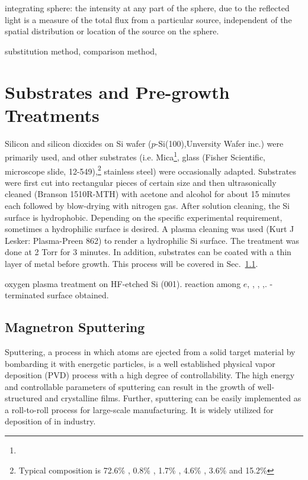 integrating sphere: the intensity at any part of the sphere, due to the reflected light is a measure of the total flux from a particular source, independent of the spatial distribution or location of the source on the sphere. 

substitution method, comparison method, 

\fi
\section{Substrates and Pre-growth Treatments}\label{ch2sub}

Silicon and silicon dioxides on Si wafer ($p$-Si(100),Unversity Wafer inc.) were primarily used, and other substrates (i.e. Mica\footnote{ }, glass (Fisher Scientific, microscope slide, 12-549),\footnote{Typical composition is 72.6\% , 0.8\% , 1.7\% , 4.6\% , 3.6\%  and 15.2\% } stainless steel) were occasionally adapted. Substrates were first cut into rectangular pieces of certain size and then ultrasonically cleaned (Branson 1510R-MTH) with acetone and alcohol for about 15 minutes each followed by blow-drying with nitrogen gas. After solution cleaning, the Si surface is hydrophobic. Depending on the specific experimental requirement, sometimes a hydrophilic surface is desired. A plasma cleaning was used (Kurt J Lesker: Plasma-Preen 862) to render a hydrophilic Si surface. The treatment was done at 2 Torr  for 3 minutes. In addition, substrates can be coated with a thin layer of metal before growth. This process will be covered  in Sec.~\ref{sec:mag}.

oxygen plasma treatment on HF-etched Si (001). reaction among $e$, , , ,. -terminated surface obtained.\cite{Habib2010}

\subsection{Magnetron Sputtering}\label{sec:mag}

Sputtering, a process in which atoms are ejected from a solid target material by bombarding it with energetic particles, is a well established physical vapor deposition (PVD) process with a high degree of controllability. The high energy and controllable parameters of sputtering can result in the growth of well-structured and crystalline films. Further, sputtering can be easily implemented as a roll-to-roll process for large-scale manufacturing. It is widely utilized for deposition of  in industry.

